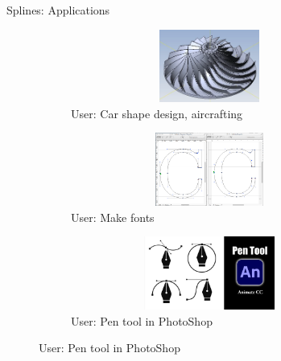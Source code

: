\documentclass[aspectratio=169]{beamer}
\begin{document}
\begin{frame}[t]{Splines: Applications}
\vspace{-0.6cm}
    \begin{figure}[H]
        \begin{subfigure}[t]{0.32\textwidth}
            \centering\includegraphics[height=2.4cm,width=1\textwidth,keepaspectratio]{lopatka.png}
            \caption*{User: Car shape design, aircrafting}
        \end{subfigure}
        \begin{subfigure}[t]{0.32\textwidth}
            \centering\includegraphics[height=2.4cm,width=1\textwidth,keepaspectratio]{font_creation.png}
            \caption*{User: Make fonts}
        \end{subfigure}
        \begin{subfigure}[t]{0.32\textwidth}
            \centering\includegraphics[height=2.4cm,width=1\textwidth,keepaspectratio]{pen_tool.jpg}
            \caption*{User: Pen tool in PhotoShop}
        \end{subfigure}


\end{figure}
\end{frame}
\end{document}
